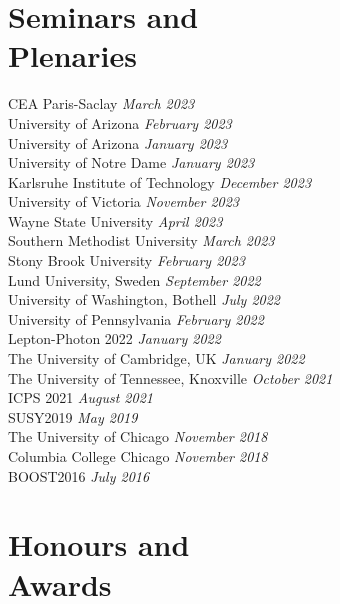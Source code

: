 \documentclass[margin,line]{resume}
\let\origsection\section%
\let\section\subsection%
\let\section\origsection%
\begin{document}
\begin{resume}
\section{\mysidestyle Seminars and\\Plenaries}
CEA Paris-Saclay \hfill \textsl{March 2023}\\
University of Arizona \hfill \textsl{February 2023}\\
University of Arizona \hfill \textsl{January 2023}\\
University of Notre Dame \hfill \textsl{January 2023}\\
Karlsruhe Institute of Technology \hfill \textsl{December 2023}\\
University of Victoria \hfill \textsl{November 2023}\\
Wayne State University \hfill \textsl{April 2023}\\
Southern Methodist University \hfill \textsl{March 2023}\\
Stony Brook University \hfill \textsl{February 2023}\\
Lund University, Sweden \hfill \textsl{September 2022}\\
University of Washington, Bothell \hfill \textsl{July 2022}\\
University of Pennsylvania \hfill \textsl{February 2022}\\
Lepton-Photon 2022 \hfill \textsl{January 2022}\\
The University of Cambridge, UK \hfill \textsl{January 2022}\\
The University of Tennessee, Knoxville \hfill \textsl{October 2021}\\
ICPS 2021 \hfill \textsl{August 2021}\\
SUSY2019 \hfill \textsl{May 2019}\\
The University of Chicago \hfill \textsl{November 2018}\\
Columbia College Chicago \hfill \textsl{November 2018}\\
BOOST2016 \hfill \textsl{July 2016}


\section{\mysidestyle Honours and\\Awards}


\end{resume}
\end{document}
